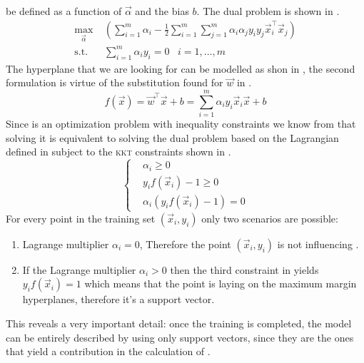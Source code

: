 be defined as a function of $\vec{\alpha}$ and the bias $b$. The dual problem is shown in .
\begin{equation}
	\label{eq:dual}
	\begin{aligned}
		\max_{\vec{\alpha}} & \left(\sum_{i = 1}^{m}{\alpha_i} - \frac{1}{2}\sum_{i =
		1}^{m}\sum_{j = 1}^{m}{\alpha_i\alpha_j y_i y_j \vec{x}_i^\top\vec{x}_j}\right)       \\
		 \text{s.t.} \hspace{10pt} & \sum_{i = 1}^{m}{\alpha_i y_i} = 0 \hspace{10pt} i = 1, \ldots, m
	\end{aligned}
\end{equation}
The hyperplane that we are looking for can be modelled as shon in , the second
formulation is virtue of the substitution found for $\vec{w}$ in .
\begin{equation}
	\label{eq:of}
	f(\vec{x}) = \vec{w}^\top\vec{x} + b = \sum_{i = 1}^m\alpha_iy_i\vec{x}_i\vec{x} + b
\end{equation}
Since  is an optimization problem with inequality constraints we
know from \cite{kkt1951} that solving it is equivalent to solving the dual problem based on the
Lagrangian defined in  subject to the \textsc{kkt} constraints shown in
.
\begin{equation}
	\label{eq:kkt-constraints}
	\begin{cases}
		 & \alpha_i \geq 0                   \\
		 & y_if(\vec{x}_i) - 1 \geq 0        \\
		 & \alpha_i(y_if(\vec{x}_i) - 1) = 0
	\end{cases}
\end{equation}
For every point in the training set $(\vec{x}_i, y_i)$ only two scenarios are possible:
\begin{enumerate}
	\item Lagrange multiplier $\alpha_i = 0$, Therefore the point $(\vec{x}_i, y_i)$ is not
		influencing .
	\item If the Lagrange multiplier $\alpha_i > 0$ then the third constraint in
	       yields $y_if(\vec{x}_i) = 1$ which means that the point is
	      laying on the maximum margin hyperplanes, therefore it's a support vector.
\end{enumerate}
This reveals a very important detail: once the training is completed, the model can be entirely
described by using only support vectors, since they are the ones that yield a contribution in the
calculation of .

